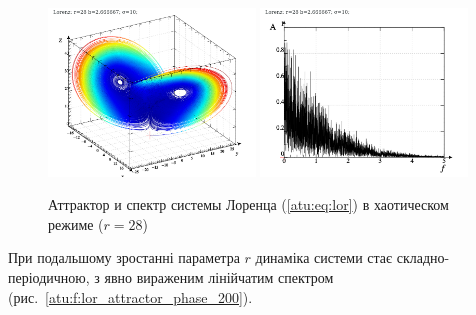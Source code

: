 \begin{figure}[ht!]
\begin{center}
  \includegraphics[width=0.49\textwidth]{p/cha/lor/lor0-p_xyz_r=028.png}
  \hfill
  \includegraphics[width=0.49\textwidth]{p/cha/lor/lor0_fft-p_f_r=028.png}
\end{center}
  \caption{Аттрактор и спектр системы Лоренца (\ref{atu:eq:lor}) в хаотическом режиме ($r=28$)}
\label{atu:f:lor_attractor_phase_chaos28}
\end{figure}

При подальшому зростанні параметра $r$ динаміка системи стає
складно-періодичною, з явно вираженим лінійчатим спектром
(рис.~\ref{atu:f:lor_attractor_phase_200}).

